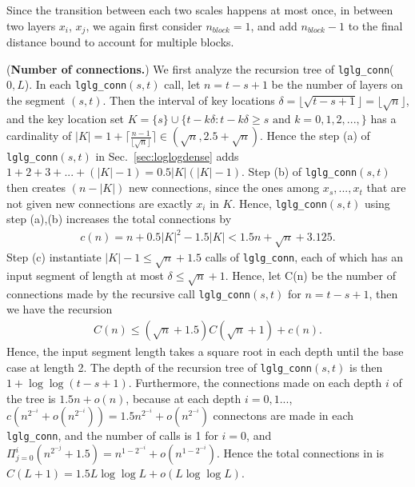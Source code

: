 \begin{myproof}
Since the transition between each two scales happens at most once, in between two layers $x_i$, $x_j$, we again first consider $n_{block}=1$, and add $n_{block}-1$ to the final distance bound to account for multiple blocks. 

(\textbf{Number of connections.})
We first analyze the recursion tree of \verb=lglg_conn=($0,L$). 
In each \verb=lglg_conn=$(s,t)$ call, let $n = t-s+1$ be the number of layers on the segment $(s,t)$. 
Then the interval of key locations $\delta = \lfloor \sqrt{t-s+1} \rfloor = \lfloor \sqrt{n} \rfloor$, and 
the key location set $K=\{s\} \cup \{ t-   k \delta  : t- k \delta  \geq s \text{ and }  k =0,1,2,..., \} $ has 
a cardinality of $|K| = 1 + \lceil \frac{n-1}{\lfloor \sqrt{n} \rfloor} \rceil \in (\sqrt{n},  2.5 + \sqrt{n})$. 
Hence the step (a) of \verb=lglg_conn=$(s,t)$ in Sec.~\ref{sec:loglogdense} adds $1+2+3+... + (|K|-1) = 0.5|K|(|K|-1)$.
Step (b) of \verb=lglg_conn=$(s,t)$ then creates $(n - |K|)$ new connections, since the ones among $x_s,..., x_t$ that are not given new connections are exactly $x_i$ in $K$. Hence, \verb=lglg_conn=$(s,t)$ using step (a),(b) increases the total connections by 
\begin{align}
   c(n) = n  + 0.5 |K|^2 - 1.5|K| < 1.5n + \sqrt{n} + 3.125.
\end{align}
Step (c) instantiate $|K|-1 \leq \sqrt{n} + 1.5$ calls of \verb=lglg_conn=, each of which has an input segment of length at most $\delta \leq \sqrt{n}  + 1$.
Hence, let C(n) be the number of connections made by the recursive call \verb=lglg_conn=$(s,t)$ for $n = t-s+1$, then we have the recursion
\begin{align}
    C(n) \leq (\sqrt{n} + 1.5) C(\sqrt{n}+1) + c(n).
\end{align}
Hence, the input segment length takes a square root in each depth until the base case at length 2. 
The depth of the recursion tree of \verb=lglg_conn=$(s,t)$ is then $1 + \log \log (t-s+1)$. Furthermore, the connections made on each depth $i$ of the tree is $1.5n + o(n)$, because at each depth $i=0,1...$, 
$c(n^{2^{-i}} + o(n^{2^{-i}})) = 1.5n^{2^{-i}} + o(n^{2^{-i}})$ connectons are made in each \verb=lglg_conn=, and the number of calls is 1 for $i=0$, and 
$\Pi _{j=0}^{i} (n^{2^{-j}}+1.5) = n^{1 - 2^{-i}} + o(n^{1 - 2^{-i}})$. Hence the total connections in \loglogdense is $C(L+1) = 1.5L\log\log L + o(L\log\log L)$. 


\end{myproof}
